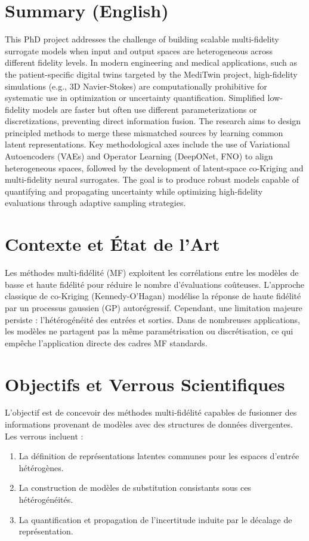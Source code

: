 \documentclass[a4paper,11pt]{article}
\begin{document}
\section*{Summary (English)}
This PhD project addresses the challenge of building scalable multi-fidelity surrogate models when input and output spaces are heterogeneous across different fidelity levels. In modern engineering and medical applications, such as the patient-specific digital twins targeted by the MediTwin project, high-fidelity simulations (e.g., 3D Navier-Stokes) are computationally prohibitive for systematic use in optimization or uncertainty quantification. Simplified low-fidelity models are faster but often use different parameterizations or discretizations, preventing direct information fusion. The research aims to design principled methods to merge these mismatched sources by learning common latent representations. Key methodological axes include the use of Variational Autoencoders (VAEs) and Operator Learning (DeepONet, FNO) to align heterogeneous spaces, followed by the development of latent-space co-Kriging and multi-fidelity neural surrogates. The goal is to produce robust models capable of quantifying and propagating uncertainty while optimizing high-fidelity evaluations through adaptive sampling strategies.

\newpage

\section{Contexte et État de l'Art}
Les méthodes multi-fidélité (MF) exploitent les corrélations entre les modèles de basse et haute fidélité pour réduire le nombre d'évaluations coûteuses. L'approche classique de co-Kriging (Kennedy-O’Hagan) modélise la réponse de haute fidélité par un processus gaussien (GP) autorégressif. Cependant, une limitation majeure persiste : l'hétérogénéité des entrées et sorties. Dans de nombreuses applications, les modèles ne partagent pas la même paramétrisation ou discrétisation, ce qui empêche l'application directe des cadres MF standards.

\section{Objectifs et Verrous Scientifiques}
L'objectif est de concevoir des méthodes multi-fidélité capables de fusionner des informations provenant de modèles avec des structures de données divergentes. Les verrous incluent :
\begin{enumerate}
    \item La définition de représentations latentes communes pour les espaces d'entrée hétérogènes.
    \item La construction de modèles de substitution consistants sous ces hétérogénéités.
    \item La quantification et propagation de l'incertitude induite par le décalage de représentation.
\end{enumerate}
\end{document}
